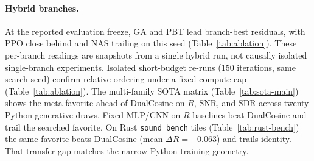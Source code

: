\paragraph{Hybrid branches.}
At the reported evaluation freeze, GA and PBT lead branch-best residuals, with PPO close behind and NAS trailing on this seed (Table~\ref{tab:ablation}).
These per-branch readings are snapshots from a single hybrid run, not causally isolated single-branch experiments.
Isolated short-budget re-runs (150 iterations, same search seed) confirm relative ordering under a fixed compute cap (Table~\ref{tab:ablation}).
The multi-family SOTA matrix (Table~\ref{tab:sota-main}) shows the meta favorite ahead of DualCosine on $R$, SNR, and SDR across twenty Python generative draws. Fixed MLP/CNN-on-$R$ baselines beat DualCosine and trail the searched favorite.
On Rust \texttt{sound\_bench} tiles (Table~\ref{tab:rust-bench}) the same favorite beats DualCosine (mean $\Delta R={+}0.063$) and trails identity. That transfer gap matches the narrow Python training geometry.
